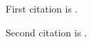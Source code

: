\documentclass[english]{article}
\begin{document}
First citation is \cite{userinputs}.

\newpage

Second citation is \cite{userinputs}.

\printbibliography
\end{document}
